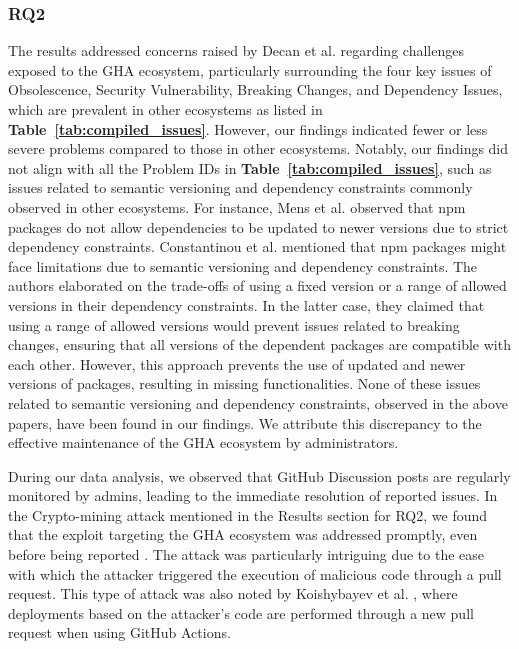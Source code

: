 \documentclass[conference]{IEEEtran}
\begin{document}
\subsubsection{\textbf{RQ2}} The results addressed concerns raised by Decan et al. \cite{decan2022use} regarding challenges exposed to the GHA ecosystem, particularly surrounding the four key issues of Obsolescence, Security Vulnerability, Breaking Changes, and Dependency Issues, which are prevalent in other ecosystems as listed in \textbf{Table~\ref{tab:compiled_issues}}. However, our findings indicated fewer or less severe problems compared to those in other ecosystems. Notably, our findings did not align with all the Problem IDs in \textbf{Table~\ref{tab:compiled_issues}}, such as issues related to semantic versioning and dependency constraints commonly observed in other ecosystems. For instance, Mens et al. \cite{decan2018evolution} observed that npm packages do not allow dependencies to be updated to newer versions due to strict dependency constraints. Constantinou et al. \cite{decan2018impact} mentioned that npm packages might face limitations due to semantic versioning and dependency constraints. The authors elaborated on the trade-offs of using a fixed version or a range of allowed versions in their dependency constraints. In the latter case, they claimed that using a range of allowed versions would prevent issues related to breaking changes, ensuring that all versions of the dependent packages are compatible with each other. However, this approach prevents the use of updated and newer versions of packages, resulting in missing functionalities. None of these issues related to semantic versioning and dependency constraints, observed in the above papers, have been found in our findings. We attribute this discrepancy to the effective maintenance of the GHA ecosystem by administrators.

	During our data analysis, we observed that GitHub Discussion posts are regularly monitored by admins, leading to the immediate resolution of reported issues. In the Crypto-mining attack mentioned in the Results section for RQ2, we found that the exploit targeting the GHA ecosystem was addressed promptly, even before being reported \cite{thibaultduponchelle2024}. The attack was particularly intriguing due to the ease with which the attacker triggered the execution of malicious code through a pull request. This type of attack was also noted by Koishybayev et al. \cite{koishybayev2022characterizing}, where deployments based on the attacker's code are performed through a new pull request when using GitHub Actions. 
\end{document}
